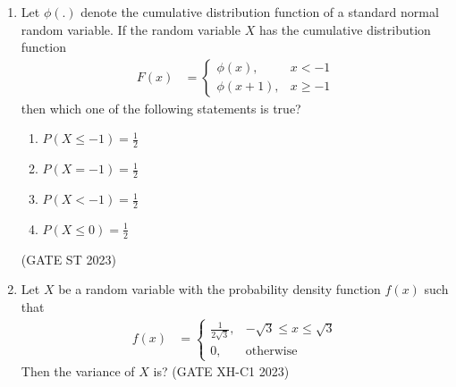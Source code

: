 \begin{enumerate}
\item Let $\phi(.)$ denote the cumulative distribution function of a standard normal
random variable. If the random variable $X$ has the cumulative distribution
function 
\begin{align}
	F(x)&= 
    \begin{cases}
        \phi(x), &  x < -1 \\
        \phi(x+1) , &  x \ge -1
    \end{cases} 
\end{align}
then which one of the following statements is true?
\begin{enumerate}
\item $P(X \leq -1) = \frac{1}{2}$
\item $P(X = -1) = \frac{1}{2}$
\item $P(X < -1) = \frac{1}{2}$
\item $P(X \leq 0) = \frac{1}{2}$
\end{enumerate}
\hfill(GATE ST 2023)
\\

\item Let $X$ be a random variable with the probability density function $f(x)$ such that
\begin{align}
f(x) &= 
	\begin{cases}
		\frac{1}{2\sqrt{3}}, & -\sqrt{3} \leq x \leq \sqrt{3} \\
		0, & \text{otherwise}
	\end{cases}
\end{align}
Then the variance of $X$ is?
\hfill(GATE XH-C1 2023)
\\

\end{enumerate}
